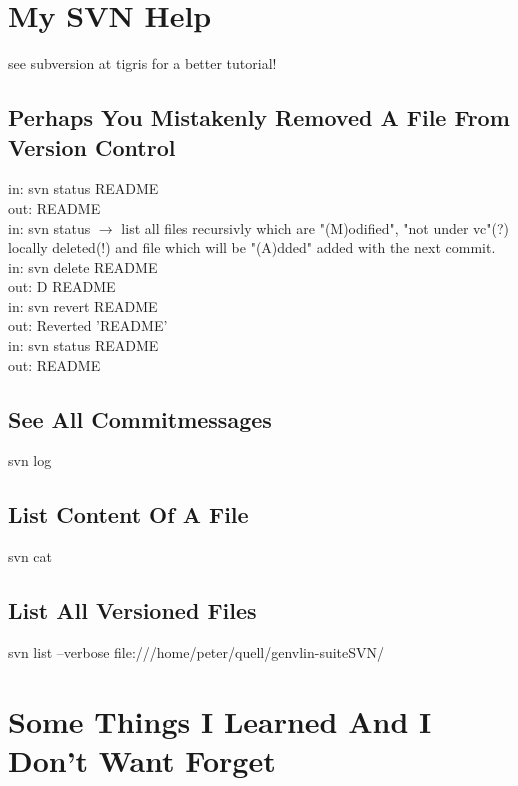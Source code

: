 \documentclass[12pt]{article}
\begin{document}
\section{My SVN Help}
see subversion at tigris for a better tutorial!
\subsection{Perhaps You Mistakenly Removed A File From Version Control}
in:  svn status README\\
out: README\\
in:  svn status
$\rightarrow$ list all files recursivly which are "(M)odified", "not under vc"(?)
locally deleted(!) and file which will be "(A)dded" added with the next commit.\\
in:  svn delete README\\
out: D         README\\
in: svn revert README\\
out: Reverted 'README'\\
in: svn status README\\
out: README\\
\subsection{See All Commitmessages}
svn log
\subsection{List Content Of A File}
svn cat
\subsection{List All Versioned Files}
svn list --verbose file:///home/peter/quell/genvlin-suiteSVN/
\section{Some Things I Learned And I Don't Want Forget}
\end{document}
